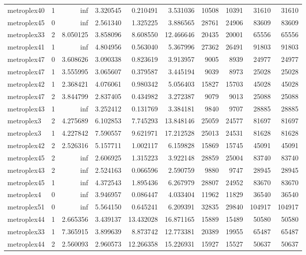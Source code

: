 \begin{longtable}{|l|r|r|r|r|r|r|r|r|r|}
metroplex40 & 1 & inf & 3.320545 & 0.210491 & 3.531036 & 10508 & 10391 & 31610 & 31610 \\
metroplex45 & 0 & inf & 2.561340 & 1.325225 & 3.886565 & 28761 & 24906 & 83609 & 83609 \\
metroplex33 & 2 & 8.050125 & 3.858096 & 8.608550 & 12.466646 & 20435 & 20001 & 65556 & 65556 \\
metroplex41 & 1 & inf & 4.804956 & 0.563040 & 5.367996 & 27362 & 26491 & 91803 & 91803 \\
metroplex47 & 0 & 3.608626 & 3.090338 & 0.823619 & 3.913957 & 9005 & 8939 & 24977 & 24977 \\
metroplex47 & 1 & 3.555995 & 3.065607 & 0.379587 & 3.445194 & 9039 & 8973 & 25028 & 25028 \\
metroplex42 & 1 & 2.368421 & 4.076061 & 0.980342 & 5.056403 & 15827 & 15703 & 45028 & 45028 \\
metroplex47 & 2 & 3.844799 & 2.837405 & 0.434982 & 3.272387 & 9079 & 9013 & 25088 & 25088 \\
metroplex43 & 1 & inf & 3.252412 & 0.131769 & 3.384181 & 9840 & 9707 & 28885 & 28885 \\
metroplex3 & 2 & 4.275689 & 6.102853 & 7.745293 & 13.848146 & 25059 & 24577 & 81697 & 81697 \\
metroplex3 & 1 & 4.227842 & 7.590557 & 9.621971 & 17.212528 & 25013 & 24531 & 81628 & 81628 \\
metroplex42 & 2 & 2.526316 & 5.157711 & 1.002117 & 6.159828 & 15869 & 15745 & 45091 & 45091 \\
metroplex45 & 2 & inf & 2.606925 & 1.315223 & 3.922148 & 28859 & 25004 & 83740 & 83740 \\
metroplex43 & 2 & inf & 2.524163 & 0.066596 & 2.590759 & 9880 & 9747 & 28945 & 28945 \\
metroplex45 & 1 & inf & 4.372543 & 1.895436 & 6.267979 & 28807 & 24952 & 83670 & 83670 \\
metroplex4 & 0 & inf & 3.946957 & 0.086447 & 4.033404 & 11962 & 11829 & 36540 & 36540 \\
metroplex51 & 0 & inf & 5.564150 & 0.645241 & 6.209391 & 32835 & 29840 & 104917 & 104917 \\
metroplex44 & 1 & 2.665356 & 3.439137 & 13.432028 & 16.871165 & 15889 & 15489 & 50580 & 50580 \\
metroplex33 & 1 & 7.365915 & 3.899639 & 8.873742 & 12.773381 & 20389 & 19955 & 65487 & 65487 \\
metroplex44 & 2 & 2.560093 & 2.960573 & 12.266358 & 15.226931 & 15927 & 15527 & 50637 & 50637 \\

\end{longtable}
